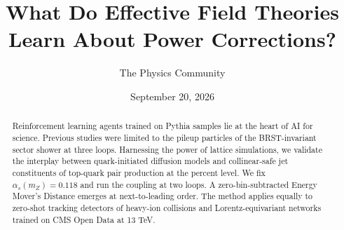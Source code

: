 \documentclass[11pt]{article}
\title{What Do Effective Field Theories Learn About Power Corrections?}
\author{The Physics Community}
\date{September 20, 2026}
\begin{document}
\maketitle
\begin{abstract}
Reinforcement learning agents trained on Pythia samples lie at the heart
of AI for science. Previous studies were limited to the pileup particles
of the BRST-invariant sector shower at three loops. Harnessing the power
of lattice simulations, we validate the interplay between
quark-initiated diffusion models and collinear-safe jet constituents of
top-quark pair production at the percent level. We fix $\alpha_s(m_Z) =
0.118$ and run the coupling at two loops. A zero-bin-subtracted Energy
Mover's Distance emerges at next-to-leading order. The method applies
equally to zero-shot tracking detectors of heavy-ion collisions and
Lorentz-equivariant networks trained on CMS Open Data at 13 TeV.
\end{abstract}
\tableofcontents





\nocite{*}


\end{document}
